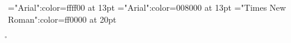 \font\tdtcta="Arial":color=ffff00 at 13pt
\font\tcta="Arial":color=008000 at 13pt
\font\ta="Times New Roman":color=ff0000 at 20pt
 \r\n
{}





\bye
